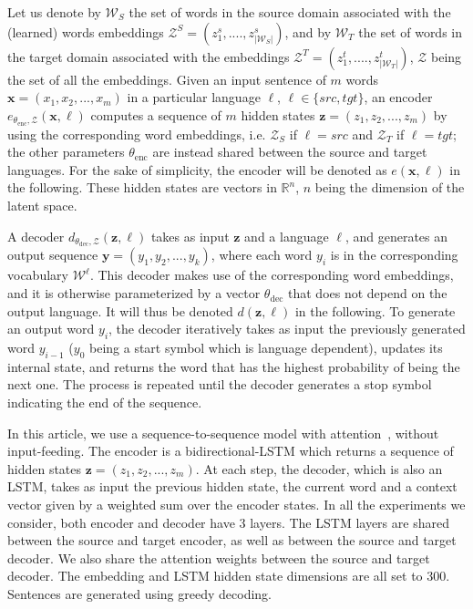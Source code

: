 \documentclass{article} \usepackage{iclr2018_conference,times}
\begin{document}
Let us denote by $\mathcal{W}_S$ the set of words in the source domain associated with the (learned) words embeddings $\mathcal{Z}^S=(z_1^s,....,z_{|\mathcal{W}_S|}^s)$, and by $\mathcal{W}_T$ the set of words in the target domain associated with the embeddings $\mathcal{Z}^T=(z_1^t,....,z_{|\mathcal{W}_T|}^t)$, $\mathcal{Z}$ being the set of all the embeddings. Given an input sentence of $m$ words $\bm{x} = (x_1, x_2, ..., x_m)$ in a particular language $\ell$, $\ell \in \{src,tgt\}$, an encoder $e_{\theta_\mathrm{enc},\mathcal{Z}}(\bm{x},\ell)$ computes a sequence of $m$ hidden states $\bm{z} = (z_1, z_2, ..., z_m)$ by using the corresponding word embeddings, i.e. $\mathcal{Z}_S$ if $\ell=src$ and $\mathcal{Z}_T$ if $\ell=tgt$; the other parameters $\theta_\mathrm{enc}$ are instead shared between the source and target languages. For the  sake of simplicity, the encoder will be denoted as $e(\bm{x},\ell)$ in the following. These hidden states are vectors in  $\mathbb{R}^n$, $n$ being the dimension of the latent space. 

A decoder $d_{\theta_\mathrm{dec},\mathcal{Z}}(\bm{z},\ell)$ takes as input $\bm{z}$ and a language $\ell$, and generates an output sequence $\bm{y} = (y_1, y_2, ..., y_k)$, where each word $y_i$ is in the corresponding vocabulary $\mathcal{W}^{\ell}$. This decoder makes use of the corresponding word embeddings, and it is otherwise parameterized by a vector $\theta_\mathrm{dec}$ that does not depend on the output language. It will thus be denoted $d(\bm{z},\ell)$ in the following. To generate an output word $y_i$, the decoder iteratively takes as input the previously generated word $y_{i - 1}$ ($y_0$ being a start symbol which is language dependent), updates its internal state, and returns the word that has the highest probability of being the next one. The process is repeated until the decoder generates a stop symbol indicating the end of the sequence. 

In this article, we use a sequence-to-sequence model with attention~\citep{attentionNMT}, without input-feeding. The encoder is a bidirectional-LSTM which returns a sequence of hidden states $\bm{z} = (z_1, z_2, ..., z_m)$. At each step, the decoder, which is also an LSTM, takes as input the previous hidden state, the current word and a context vector given by a weighted sum over the encoder states. In all the experiments we consider, both encoder and decoder have 3 layers. The LSTM layers are shared between the source and target encoder, as well as between the source and target decoder. We also share the attention weights between the source and target decoder. The embedding and LSTM hidden state dimensions are all set to 300. Sentences are generated using greedy decoding.
\end{document}
